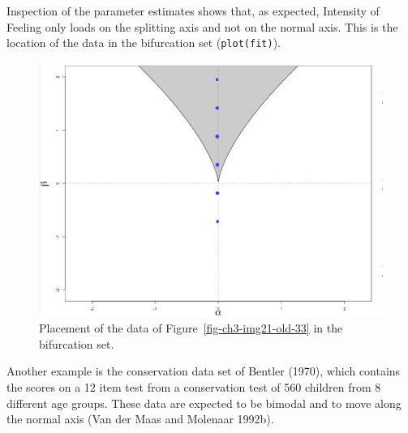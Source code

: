 \documentclass[
  a4paper,
  DIV=11,
  numbers=noendperiod]{scrreprt}
\begin{document}
Inspection of the parameter estimates shows that, as expected, Intensity
of Feeling only loads on the splitting axis and not on the normal axis.
This is the location of the data in the bifurcation set
(\texttt{plot(fit)}).

\begin{figure}

{\centering \includegraphics{media/ch3/image24.jpg}

}

\caption{\label{fig-ch3-img24-old-36}Placement of the data of
Figure~\ref{fig-ch3-img21-old-33} in the bifurcation set.}

\end{figure}

Another example is the conservation data set of Bentler (1970), which
contains the scores on a 12 item test from a conservation test of 560
children from 8 different age groups. These data are expected to be
bimodal and to move along the normal axis (Van der Maas and Molenaar
1992b).
\end{document}
